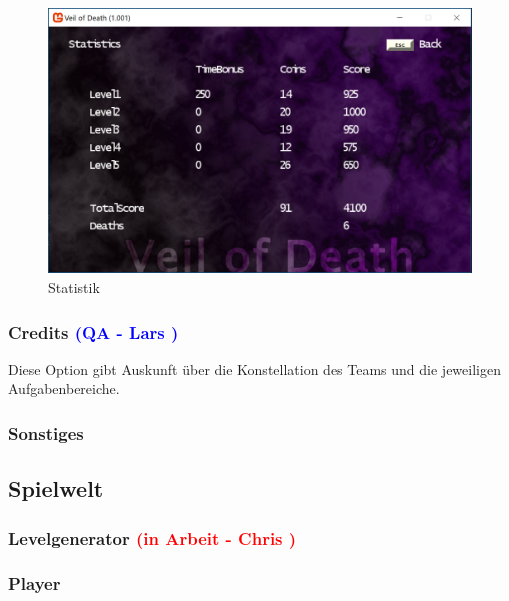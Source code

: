 \documentclass{article}
\begin{document}
\begin{figure}
	\centering
	\includegraphics[width=1\textwidth]{Statistics}
	\caption{Statistik
		\label{fig:statistics}}
\end{figure}

\vspace{1cm}
\subsubsection{Credits \textcolor{blue}{(QA - Lars )}}

Diese Option gibt Auskunft über die Konstellation des Teams und die jeweiligen Aufgabenbereiche.

\vspace{1cm}
\subsubsection{Sonstiges}

\vspace{2cm}
\subsection{Spielwelt}

\vspace{1cm}
\subsubsection{Levelgenerator  \textcolor{red}{(in Arbeit - Chris )}}

\vspace{1cm}
\subsubsection{Player}
\end{document}
